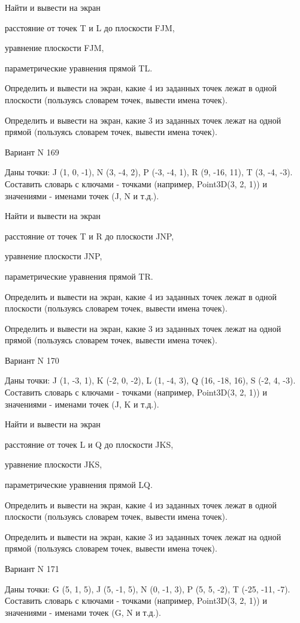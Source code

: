\documentclass[11pt]{report}
\begin{document}
Найти и вывести на экран


расстояние от точек T и L до плоскости FJM,


уравнение плоскости FJM,


параметрические уравнения прямой TL.


Определить и вывести на экран, какие 4 из заданных точек лежат в одной плоскости (пользуясь словарем точек, вывести имена точек).


Определить и вывести на экран, какие 3 из заданных точек лежат на одной прямой (пользуясь словарем точек, вывести имена точек).

\newpage
Вариант N 169

Даны точки: J (1, 0, -1), N (3, -4, 2), P (-3, -4, 1), R (9, -16, 11), T (3, -4, -3).
Составить словарь с ключами - точками (например, Point3D(3, 2, 1)) и значениями - именами точек (J, N и т.д.).


Найти и вывести на экран


расстояние от точек T и R до плоскости JNP,


уравнение плоскости JNP,


параметрические уравнения прямой TR.


Определить и вывести на экран, какие 4 из заданных точек лежат в одной плоскости (пользуясь словарем точек, вывести имена точек).


Определить и вывести на экран, какие 3 из заданных точек лежат на одной прямой (пользуясь словарем точек, вывести имена точек).

\newpage
Вариант N 170

Даны точки: J (1, -3, 1), K (-2, 0, -2), L (1, -4, 3), Q (16, -18, 16), S (-2, 4, -3).
Составить словарь с ключами - точками (например, Point3D(3, 2, 1)) и значениями - именами точек (J, K и т.д.).


Найти и вывести на экран


расстояние от точек L и Q до плоскости JKS,


уравнение плоскости JKS,


параметрические уравнения прямой LQ.


Определить и вывести на экран, какие 4 из заданных точек лежат в одной плоскости (пользуясь словарем точек, вывести имена точек).


Определить и вывести на экран, какие 3 из заданных точек лежат на одной прямой (пользуясь словарем точек, вывести имена точек).

\newpage
Вариант N 171

Даны точки: G (5, 1, 5), J (5, -1, 5), N (0, -1, 3), P (5, 5, -2), T (-25, -11, -7).
Составить словарь с ключами - точками (например, Point3D(3, 2, 1)) и значениями - именами точек (G, N и т.д.).
\end{document}

